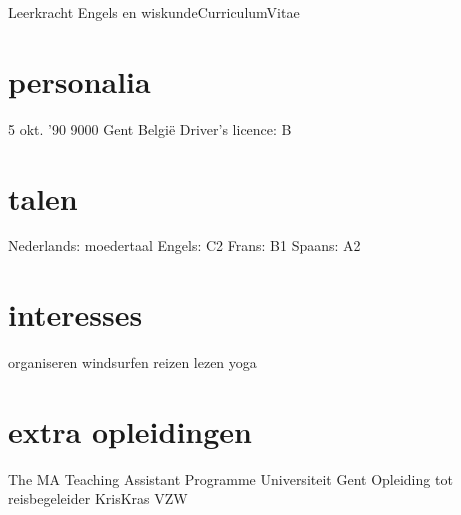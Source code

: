 \documentclass[]{friggeri-cv}
\begin{document}
       {Leerkracht Engels en wiskunde}{Curriculum}{Vitae}
 \begin{aside}
  \vspace{0.6cm}\section{personalia}
    5 okt. '90
    9000 Gent
    Belgi\"e\vspace{0.21cm}
    \vspace{0.21cm}
    Driver's licence: B \vspace{-1.25mm}
  \section{talen}
    Nederlands: moedertaal
    Engels: C2
    Frans:  B1  
    Spaans: A2\vspace{3.3mm}
  \section{interesses}
  organiseren
  windsurfen
  reizen
  lezen
  yoga\vspace{3.3mm}
  \section{extra opleidingen}
  The MA Teaching Assistant Programme
  {\footnotesize{}Universiteit Gent} \vspace{0.25cm}
  Opleiding tot reisbegeleider
  {\footnotesize{}KrisKras VZW} \vspace{3.3mm}
\end{aside}
\vspace{-0.4cm}
\end{document}
